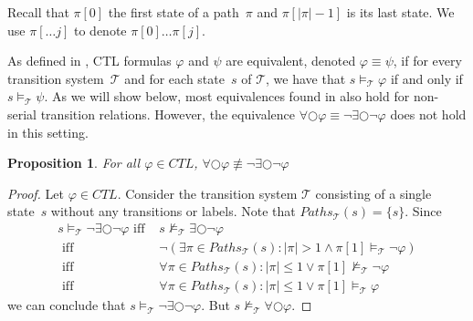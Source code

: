 \documentclass[12pt]{article}
\newcommand{\nxt}{\bigcirc}
\newtheorem{proposition}{Proposition}
\theoremstyle{definition}
\begin{document}
Recall that $\pi[0]$ the first state of a path~$\pi$ and $\pi[|\pi|-1]$ is its last state.  We use $\pi[\ldots j]$ to denote $\pi[0] \ldots \pi[j]$.

As defined in \cite[Definition~6.12]{BK08}, CTL formulas $\varphi$ and $\psi$ are equivalent, denoted $\varphi \equiv \psi$, if for every transition system~$\mathcal{T}$ and for each state~$s$ of $\mathcal{T}$, we have that $s \models_{\mathcal{T}} \varphi$ if and only if $s \models_{\mathcal{T}} \psi$.  As we will show below, most equivalences found in \cite[Figure~6.5]{BK08} also hold for non-serial transition relations.  However, the equivalence $\forall \nxt \varphi \equiv \neg \exists \nxt \neg \varphi$ does not hold in this setting.

\begin{proposition}
For all $\varphi \in \mathit{CTL}$, $\forall \nxt \varphi \not\equiv \neg \exists \nxt \neg \varphi$
\end{proposition}
\begin{proof}
Let $\varphi \in \mathit{CTL}$.  Consider the transition system $\mathcal{T}$ consisting of a single state~$s$ without any transitions or labels.  Note that $\mathit{Paths}_{\mathcal{T}}(s) = \{ s \}$.  Since 
\begin{align*}
s \models_{\mathcal{T}} \neg \exists \nxt \neg \varphi
\mbox{ iff } & s \not\models_{\mathcal{T}} \exists \nxt \neg \varphi\\
\mbox{ iff } & \neg (\exists \pi \in \mathit{Paths}_{\mathcal{T}}(s) : |\pi| > 1 \wedge \pi[1] \models_{\mathcal{T}} \neg \varphi)\\
\mbox{ iff } & \forall \pi \in \mathit{Paths}_{\mathcal{T}}(s) : |\pi| \leq 1 \vee \pi[1] \not\models_{\mathcal{T}} \neg \varphi\\
\mbox{ iff } & \forall \pi \in \mathit{Paths}_{\mathcal{T}}(s) : |\pi| \leq 1 \vee \pi[1] \models_{\mathcal{T}} \varphi
\end{align*}
we can conclude that $s \models_{\mathcal{T}} \neg \exists \nxt \neg \varphi$.  But $s \not\models_{\mathcal{T}} \forall \nxt \varphi$.
\end{proof}
\end{document}
